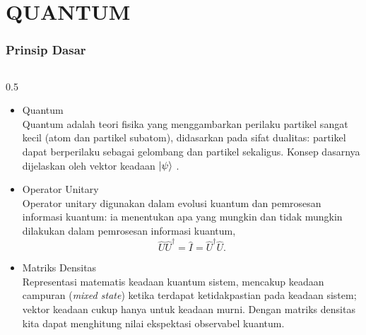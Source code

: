 \section{QUANTUM}

\begin{frame}
    \frametitle{Prinsip Dasar}
    \begin{columns}[T]
        \begin{column}{0.5\textwidth}
            \begin{itemize}\tiny\justifying
                \item Quantum \\
                    Quantum adalah teori fisika yang menggambarkan perilaku
                    partikel sangat kecil (atom dan partikel subatom),
                    didasarkan pada sifat dualitas: partikel dapat berperilaku
                    sebagai gelombang dan partikel sekaligus. Konsep dasarnya
                    dijelaskan oleh vektor keadaan $\ket{\psi}$
                    \cite{barnett2009quantum}.
                \item Operator Unitary \\
                    Operator unitary digunakan dalam evolusi kuantum dan
                    pemrosesan informasi kuantum: ia menentukan apa yang
                    mungkin dan tidak mungkin dilakukan dalam pemrosesan
                    informasi kuantum,
                    \begin{equation}
                        \hat{U}\hat{U}^\dagger=\hat{I}=\hat{U}^\dagger\hat{U}.
                    \end{equation}
                \item Matriks Densitas \\
                    Representasi matematis keadaan kuantum sistem, mencakup
                    keadaan campuran (\textit{mixed state}) ketika terdapat
                    ketidakpastian pada keadaan sistem; vektor keadaan cukup
                    hanya untuk keadaan murni. Dengan matriks densitas kita
                    dapat menghitung nilai ekspektasi observabel kuantum.
            \end{itemize}
        \end{column}


\end{columns}
\end{frame}
